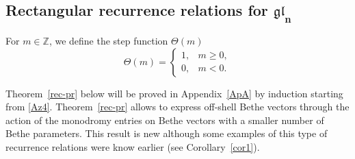 \documentclass[pdftex]{sigma}
\theoremstyle{definition}
\def\ZZ{{\mathbb Z}}
\begin{document}
\subsection[Rectangular recurrence relations for gl\_n]{Rectangular recurrence relations for $\boldsymbol{\mathfrak{gl}_n}$}

For $m\in\ZZ$, we define the step function $\Theta(m)$
\[%
\Theta(m)=\begin{cases}1,& m\geq 0,\\ 0,&  m<0.
\end{cases}
\]

Theorem~\ref{rec-pr} below will be proved in Appendix~\ref{ApA} by induction starting from \eqref{Az4}. Theorem~\ref{rec-pr} allows to express
off-shell Bethe vectors through the action of the monodromy entries on Bethe
vectors with a smaller number of Bethe parameters. This result is new
although some examples of this type of recurrence relations were know earlier
(see Corollary~\ref{cor1}).
\end{document}

